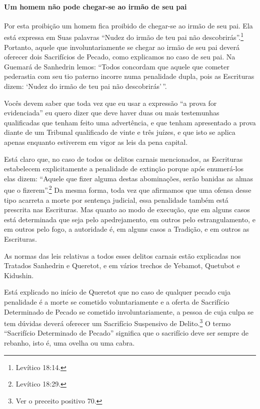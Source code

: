 \paragraph{Um homem não pode chegar-se ao irmão de seu pai}

Por esta proibição um homem fica proibido de chegar-se ao irmão de seu
pai. Ela está expressa em Suas palavras ``Nudez do irmão de teu pai não
descobrirás''.\footnote{Levítico 18:14.} Portanto, aquele que involuntariamente
se chegar ao irmão de seu pai deverá oferecer dois Sacrifícios de
Pecado, como explicamos no caso de seu pai. Na Guemará de Sanhedrin
lemos: ``Todos concordam que aquele que cometer pederastia com seu tio
paterno incorre numa penalidade dupla, pois as Escrituras dizem: `Nudez
do irmão de teu pai não descobrirás'\,''.

Vocês devem saber que toda vez que eu usar a expressão ``a prova
for evidenciada'' eu quero dizer que deve haver duas ou mais testemunhas
qualificadas que tenham feito uma advertência, e que tenham apresentado
a prova diante de um Tribunal qualificado de vinte e três juízes, e que
isto se aplica apenas enquanto estiverem em vigor as leis da pena
capital.

Está claro que, no caso de todos os delitos carnais mencionados, as
Escrituras estabelecem explicitamente a penalidade de extinção porque
após enumerá-los elas dizem: ``Aquele que fizer alguma destas
abominações, serão banidas as almas que o fizerem''.\footnote{Levítico 18:29.} Da
mesma forma, toda vez que afirmamos que uma ofensa desse tipo acarreta a
morte por sentença judicial, essa penalidade também está prescrita nas
Escrituras. Mas quanto ao modo de execução, que em alguns casos está
determinada que seja pelo apedrejamento, em outros pelo estrangulamento,
e em outros pelo fogo, a autoridade é, em alguns casos a Tradição, e em
outros as Escrituras.

As normas das leis relativas a todos esses delitos carnais estão
explicadas nos Tratados Sanhedrin e Queretot, e em vários trechos de
Yebamot, Quetubot e Kidushin.

Está explicado no início de Queretot que no caso de qualquer pecado
cuja penalidade é a morte se cometido voluntariamente e a oferta de
Sacrifício Determinado de Pecado se cometido involuntariamente, a
pessoa de cuja culpa se tem dúvidas deverá oferecer um Sacrifício
Suspensivo de Delito.\footnote{Ver o preceito positivo 70.} O termo ``Sacrifício
Determinado de Pecado'' significa que o sacrifício deve ser sempre de
rebanho, isto é, uma ovelha ou uma cabra.

